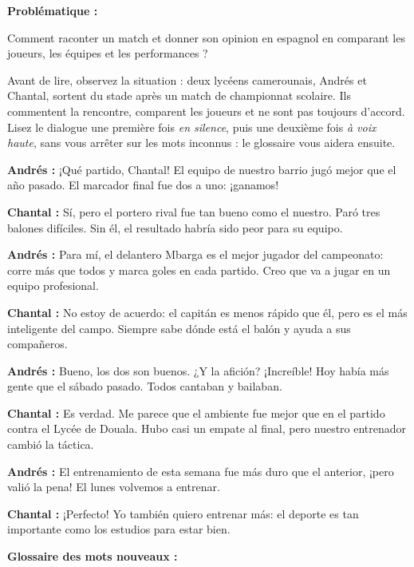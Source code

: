 \documentclass[11pt]{article}
\newcounter{popsec}
\newcounter{popsub}
\newcommand{\courssub}[1]{%
  \stepcounter{popsub}%
  \par\vspace{9pt}\noindent{\popxbold\fontsize{11.5}{13}\selectfont\color{popink}{\color{poporange}\thepopsec.\thepopsub}\hspace{6pt}#1}\par\nopagebreak\vspace{4pt}
}
\begin{document}
\textbf{Problématique :}\par
Comment raconter un match et donner son opinion en espagnol en comparant les joueurs, les équipes et les performances ?

\courssub{Lecture globale du dialogue}

Avant de lire, observez la situation : deux lycéens camerounais, Andrés et Chantal, sortent du stade après un match de championnat scolaire. Ils commentent la rencontre, comparent les joueurs et ne sont pas toujours d'accord. Lisez le dialogue une première fois \emph{en silence}, puis une deuxième fois \emph{à voix haute}, sans vous arrêter sur les mots inconnus : le glossaire vous aidera ensuite.

\begin{textebox}
\textbf{Andrés :} ¡Qué partido, Chantal! El equipo de nuestro barrio jugó mejor que el año pasado. El marcador final fue dos a uno: ¡ganamos!\par
\textbf{Chantal :} Sí, pero el portero rival fue tan bueno como el nuestro. Paró tres balones difíciles. Sin él, el resultado habría sido peor para su equipo.\par
\textbf{Andrés :} Para mí, el delantero Mbarga es el mejor jugador del campeonato: corre más que todos y marca goles en cada partido. Creo que va a jugar en un equipo profesional.\par
\textbf{Chantal :} No estoy de acuerdo: el capitán es menos rápido que él, pero es el más inteligente del campo. Siempre sabe dónde está el balón y ayuda a sus compañeros.\par
\textbf{Andrés :} Bueno, los dos son buenos. ¿Y la afición? ¡Increíble! Hoy había más gente que el sábado pasado. Todos cantaban y bailaban.\par
\textbf{Chantal :} Es verdad. Me parece que el ambiente fue mejor que en el partido contra el Lycée de Douala. Hubo casi un empate al final, pero nuestro entrenador cambió la táctica.\par
\textbf{Andrés :} El entrenamiento de esta semana fue más duro que el anterior, ¡pero valió la pena! El lunes volvemos a entrenar.\par
\textbf{Chantal :} ¡Perfecto! Yo también quiero entrenar más: el deporte es tan importante como los estudios para estar bien.
\end{textebox}

\textbf{Glossaire des mots nouveaux :}
\end{document}
